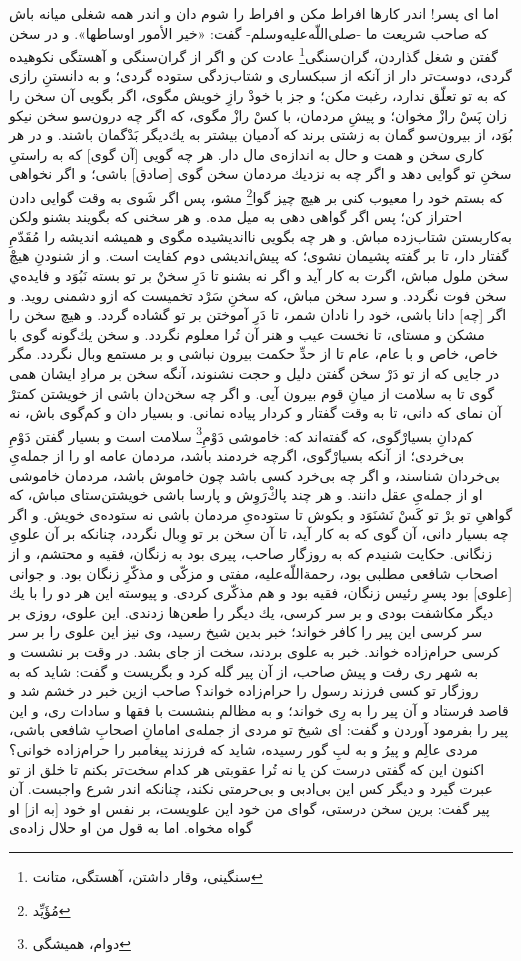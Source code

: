 اما اى پسر! اندر كارها افراط مكن و افراط را شوم دان و اندر همه شغلى ميانه باش كه صاحب شريعت ما -صلى‌اللّه‌عليه‌و‌سلم- گفت: «خير الأمور اوساطها». و در سخن گفتن و شغل گذاردن، گران‌سنگى\footnote{سنگینی، وقار داشتن، آهستگی، متانت} عادت كن و اگر از گران‌سنگى و آهستگى نكوهيده گردى، دوست‌تر دار از آنكه از سبكسارى و شتاب‌زدگى ستوده گردى؛ و به دانستنِ رازى كه به تو تعلّق ندارد، رغبت مكن؛ و جز با خودْ رازِ خويش مگوى، اگر بگويى آن سخن را زان پَسْ رازْ مخوان؛ و پيشِ مردمان، با كسْ رازْ مگوى، كه اگر چه درون‌سو سخن نيكو بُوَد، از بيرون‌سو گمان به زشتى برند كه آدميان بيشتر به يك‌ديگر بَدْگمان باشند. و در هر كارى سخن و همت و حال به اندازه‌ی مال دار. هر چه گويى [آن گوى] كه به راستیِ سخنِ تو گوايى دهد و اگر چه به نزديك مردمان سخن گوى [صادق] باشى؛ و اگر نخواهى كه بستم خود را معيوب كنى بر هيچ چيز گوا\footnote{مُؤَیِّد} مشو، پس اگر شَوى به وقت گوايى دادن احتراز كن؛ پس اگر گواهى دهى به ميل مده. و هر سخنى كه بگويند بشنو ولكن به‌كار‌بستن شتاب‌زده مباش. و هر چه بگويى نا‌انديشيده مگوى و هميشه انديشه را مُقَدّمِ گفتار دار، تا بر گفته پشيمان نشوى؛ كه پيش‌انديشى دوم كفايت است. و از شنودنِ هيچْ سخن ملول مباش، اگرت به كار آيد و اگر نه بشنو تا دَرِ سخنْ بر تو بسته نَبُوَد و فايده‌ي سخن فوت نگردد. و سرد سخن مباش، كه سخنِ سَرْد تخميست كه ازو دشمنى رويد. و اگر [چه] دانا باشى، خود را نادان شمر، تا دَرِ آموختن بر تو گشاده گردد. و هيچ سخن را مشكن و مستاى، تا نخست عيب و هنر آن تُرا معلوم نگردد. و سخن يك‌گونه گوى با خاص، خاص و با عام، عام تا از حدِّ حكمت بيرون نباشى و بر مستمع وبال نگردد. مگر در جايى كه از تو دَرْ سخن گفتن دليل و حجت نشنوند، آنگه سخن بر مرادِ ايشان همى گوى تا به سلامت از ميانِ قوم بيرون آيى. و اگر چه سخن‌دان باشى از خويشتن كمترْ آن نماى كه دانى، تا به وقت گفتار و كردار پياده نمانى. و بسيار دان و كم‌گوى باش، نه كم‌دانِ بسيارْ‌گوى، كه گفته‌اند كه: خاموشى دَوْمِ\footnote{دوام، همیشگی} سلامت است و بسيار گفتن دَوْمِ بى‌خردى؛ از آنكه بسيار‌ْگوى، اگرچه خردمند باشد، مردمان عامه او را از جمله‌یِ بى‌خردان شناسند، و اگر چه بى‌خرد كسى باشد چون خاموش باشد، مردمان خاموشى او از جمله‌یِ عقل دانند. و هر چند پاكْ‌رَوِش و پارسا باشى خويشتن‌‌ستاى مباش، كه گواهىِ تو برْ تو كَسْ نَشنَوَد و بكوش تا ستوده‌یِ مردمان باشى نه ستوده‌ی خويش. و اگر چه بسيار دانى، آن گوى كه به كار آيد، تا آن سخن بر تو وِبال نگردد، چنانكه بر آن علوىِ زنگانى. حكايت شنيدم كه به روزگار صاحب، پيرى بود به زنگان، فقيه و محتشم، و از اصحاب شافعى مطلبى بود، رحمة‌اللّه‌عليه، مفتى و مزكّى و مذكّرِ زنگان بود. و جوانى [علوى] بود پسرِ رئيس زنگان، فقيه بود و هم مذكّرى كردى. و پيوسته اين هر دو را با يك ديگر مكاشفت بودى و بر سر كرسى، يك ديگر را طعن‌ها زدندى. اين علوى، روزى بر سر كرسى اين پير را كافر خواند؛ خبر بدين شيخ رسيد، وى نيز اين علوى را بر سر كرسى حرام‌زاده خواند. خبر به علوى بردند، سخت از جاى بشد. در وقت بر نشست و به شهر رى رفت و پيش صاحب، از آن پير گله كرد و بگريست و گفت: شايد كه به روزگار تو كسى فرزند رسول را حرام‌زاده خواند؟ صاحب ازين خبر در خشم شد و قاصد فرستاد و آن پير را به رِى خواند؛ و به مظالم بنشست با فقها و سادات رى، و اين پير را بفرمود آوردن و گفت: اى شيخ تو مردى از جمله‌ی امامانِ اصحابِ شافعى باشى، مردى عالِم و پيرُ و به لبِ‌ گور رسيده، شايد كه فرزند پيغامبر را حرام‌زاده خوانى‌؟ اكنون اين كه گفتى درست كن يا نه تُرا عقوبتى هر كدام سخت‌تر بكنم تا خلق از تو عبرت گيرد و ديگر كس اين بى‌ادبى و بى‌حرمتى نكند، چنانكه اندر شرع واجبست. آن پير گفت: برين سخن درستى، گواى من خود اين علويست، بر نفس او خود [به از] او گواه مخواه. اما به قول من او حلال زاده‌ی 